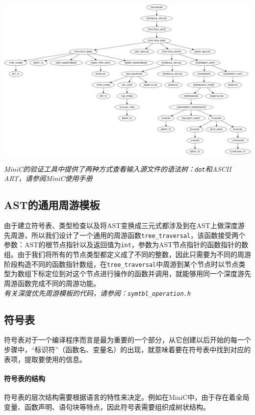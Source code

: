 \begin{center}
	\includegraphics[scale=0.2]{grammer_tree.png}
	\label{fig:grammertree}
\end{center}
{\it \manerrarrow MiniC的验证工具中提供了两种方式查看输入源文件的语法树：\verb|dot|和ASCII ART，请参阅MiniC使用手册}\\
\subsection{AST的通用周游模板}
\label{ASTtravesal}
由于建立符号表、类型检查以及将AST变换成三元式都涉及到在AST上做深度游先周游，所以我们设计了一个通用的周游函数\verb|tree_traversal|，该函数接受两个参数：AST的根节点指针以及返回值为\verb|int|，参数为AST节点指针的函数指针的数组。由于我们将所有的节点类型都定义成了不同的整数，因此只需要为不同的周游阶段构造不同的函数指针数组，在\verb|tree_traversal|中周游到某个节点时以节点类型为数组下标定位到对这个节点进行操作的函数并调用，就能够用同一个深度游先周游函数完成不同的周游功能。\\
{\it \anchor 有关深度优先周游模板的代码，请参阅：\verb|symtbl_operation.h|}\\

\subsection{符号表}
\label{symtbl}
符号表对于一个编译程序而言是最为重要的一个部分，从它创建以后开始的每一个步骤中，“标识符”（函数名、变量名）的出现，就意味着要在符号表中找到对应的表项，提取要使用的信息。

\paragraph*{符号表的结构}
符号表的层次结构需要根据语言的特性来决定。例如在MiniC中，由于存在着全局变量、函数声明、语句块等特点，因此符号表需要组织成树状结构。

